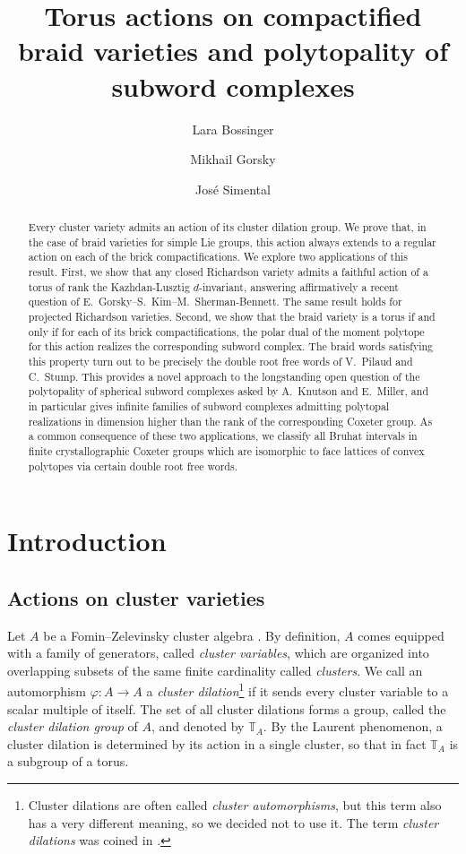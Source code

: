 \documentclass[a4paper, 11pt]{amsart}
\title[Torus actions on compactified  braid varieties]{Torus actions on compactified braid varieties and polytopality of subword complexes}
\author{Lara Bossinger}
\author{Mikhail Gorsky}
\author{José Simental}
\newcommand{\dil}[1]{\mathbb{T}_{#1}}
\theoremstyle{definition}
\begin{document}
\begin{abstract}
Every cluster variety admits an action of its cluster dilation group. We prove that, in the case of braid varieties for simple Lie groups, this action always extends to a regular action on each of the brick compactifications. We explore two applications of this result. First, we show that any closed Richardson variety admits a faithful action of a torus of rank the Kazhdan-Lusztig $d$-invariant, answering affirmatively a recent question of E.~Gorsky--S.~Kim--M.~Sherman-Bennett. The same result holds for projected Richardson varieties. Second, we show that the braid variety is a torus if and only if
for each  of its brick compactifications, the polar dual of the moment polytope for this action realizes the corresponding subword complex. The braid words satisfying this property turn out to be precisely the double root free words of V.~Pilaud and C.~Stump. This provides a novel approach to the longstanding open question of the polytopality of spherical subword complexes asked by A.~Knutson and E.~Miller, and in particular gives infinite families of subword complexes admitting polytopal realizations in dimension higher than the rank of the corresponding Coxeter group. As a common consequence of these two applications, we classify all Bruhat intervals in finite crystallographic Coxeter groups which are isomorphic to face lattices of convex polytopes via certain double root free words.
\end{abstract}

\maketitle



\section{Introduction}

\subsection{Actions on cluster varieties} Let $A$ be a Fomin--Zelevinsky cluster algebra \cite{FominZelevinsky-I}. By definition, $A$ comes equipped with a family of generators, called \emph{cluster variables}, which are organized into overlapping subsets of the same finite cardinality called \emph{clusters}. We call an automorphism $\varphi: A \to A$ a \emph{cluster dilation}\footnote{Cluster dilations are often called \emph{cluster automorphisms}, but this term also has a very different meaning, so we decided not to use it. The term \emph{cluster dilations} was coined in \cite{PMS}.} if it sends every cluster variable to a scalar multiple of itself. The set of all cluster dilations forms a group, called the \emph{cluster dilation group} of $A$, and denoted by $\dil{A}$. By the Laurent phenomenon, a cluster dilation is determined by its action in a single cluster, so that in fact $\dil{A}$ is a subgroup of a torus. 
\end{document}
